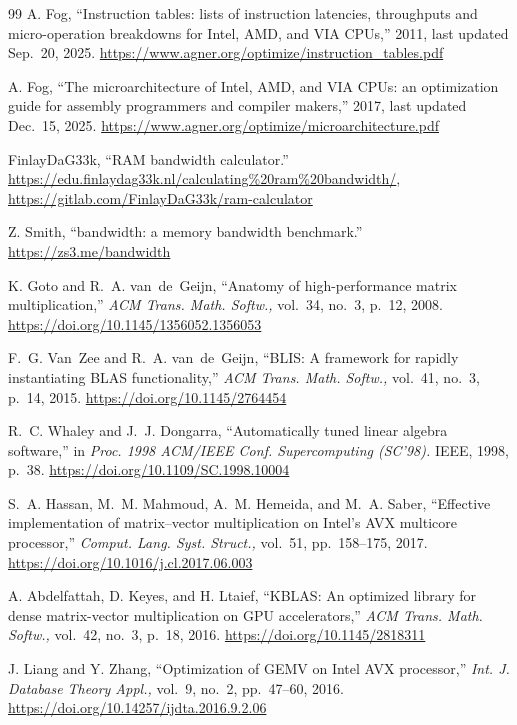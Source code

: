 \documentclass[conference]{IEEEtran}
\begin{document}
\begin{thebibliography}{99}
A. Fog,
``Instruction tables: lists of instruction latencies, throughputs and micro-operation breakdowns
for Intel, AMD, and VIA CPUs,'' 2011, last updated Sep.~20, 2025.
\url{https://www.agner.org/optimize/instruction_tables.pdf}

A. Fog,
``The microarchitecture of Intel, AMD, and VIA CPUs: an optimization guide for assembly programmers
and compiler makers,'' 2017, last updated Dec.~15, 2025.
\url{https://www.agner.org/optimize/microarchitecture.pdf}

FinlayDaG33k,
``RAM bandwidth calculator.''
\url{https://edu.finlaydag33k.nl/calculating%20ram%20bandwidth/},
\url{https://gitlab.com/FinlayDaG33k/ram-calculator}

Z. Smith,
``bandwidth: a memory bandwidth benchmark.''
\url{https://zs3.me/bandwidth}

K. Goto and R.~A. van~de~Geijn,
``Anatomy of high-performance matrix multiplication,''
\textit{ACM Trans. Math. Softw.,} vol.~34, no.~3, p.~12, 2008.
\url{https://doi.org/10.1145/1356052.1356053}

F.~G. Van~Zee and R.~A. van~de~Geijn,
``BLIS: A framework for rapidly instantiating BLAS functionality,''
\textit{ACM Trans. Math. Softw.,} vol.~41, no.~3, p.~14, 2015.
\url{https://doi.org/10.1145/2764454}

R.~C. Whaley and J.~J. Dongarra,
``Automatically tuned linear algebra software,''
in \textit{Proc. 1998 ACM/IEEE Conf. Supercomputing (SC'98).}
IEEE, 1998, p.~38.
\url{https://doi.org/10.1109/SC.1998.10004}

S.~A. Hassan, M.~M. Mahmoud, A.~M. Hemeida, and M.~A. Saber,
``Effective implementation of matrix--vector multiplication on Intel's AVX multicore processor,''
\textit{Comput. Lang. Syst. Struct.,} vol.~51, pp.~158--175, 2017.
\url{https://doi.org/10.1016/j.cl.2017.06.003}

A. Abdelfattah, D. Keyes, and H. Ltaief,
``KBLAS: An optimized library for dense matrix-vector multiplication on GPU accelerators,''
\textit{ACM Trans. Math. Softw.,} vol.~42, no.~3, p.~18, 2016.
\url{https://doi.org/10.1145/2818311}

J. Liang and Y. Zhang,
``Optimization of GEMV on Intel AVX processor,''
\textit{Int. J. Database Theory Appl.,} vol.~9, no.~2, pp.~47--60, 2016.
\url{https://doi.org/10.14257/ijdta.2016.9.2.06}


\end{thebibliography}
\end{document}
